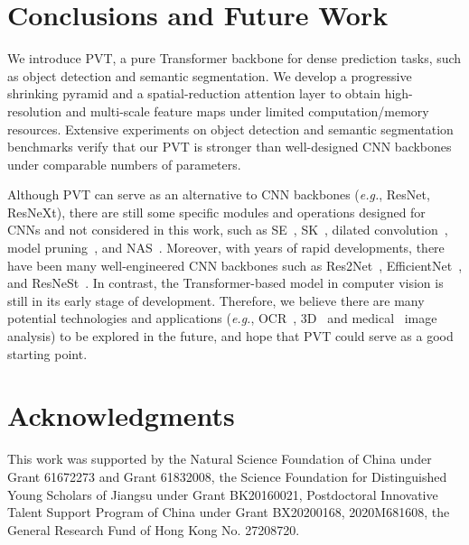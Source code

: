 \documentclass[10pt,twocolumn,letterpaper]{article}
\def\eg{\emph{e.g.}}
\begin{document}
\section{Conclusions and Future Work}

We introduce PVT, a pure Transformer backbone for dense prediction tasks, such as object detection and semantic segmentation. 
We develop a progressive shrinking pyramid and a spatial-reduction attention layer to obtain high-resolution and multi-scale feature maps under limited computation/memory resources.
Extensive experiments on object detection and semantic segmentation benchmarks verify that our PVT is stronger than well-designed CNN backbones under comparable numbers of parameters.


%
Although PVT can serve as an alternative to CNN backbones (\eg, ResNet, ResNeXt), there are still some specific modules and operations designed for CNNs and not considered in this work, such as 
SE~\cite{hu2018squeeze}, SK~\cite{li2019selective}, dilated convolution~\cite{yu2015multi}, model pruning~\cite{han2015deep}, and NAS~\cite{tan2019efficientnet}.
Moreover, with years of rapid developments, there have been many well-engineered CNN backbones such as Res2Net~\cite{gao2019res2net}, EfficientNet~\cite{tan2019efficientnet}, and ResNeSt~\cite{zhang2020resnest}.
In contrast, the Transformer-based model in computer vision is still in its early stage of development. 
%
Therefore, 
%
we believe there are many potential technologies and applications (\eg, OCR~\cite{wang2019shape,wang2020ae,wang2021pan++}, 3D~\cite{hui2020progressive,cheng2021sspc,hui2021efficient} and medical~\cite{fan2021concealed,fan2020pranet,ji2021progressively} image analysis) to be explored in the future, and hope that PVT could serve as a good starting point.
%

\section*{Acknowledgments}
This work was supported by the Natural Science Foundation of China under Grant 61672273 and Grant 61832008, the Science Foundation for Distinguished Young Scholars of Jiangsu under Grant BK20160021, Postdoctoral Innovative Talent Support Program of China under Grant BX20200168, 2020M681608, the General Research Fund of Hong Kong No. 27208720.

{\small


}
\end{document}
